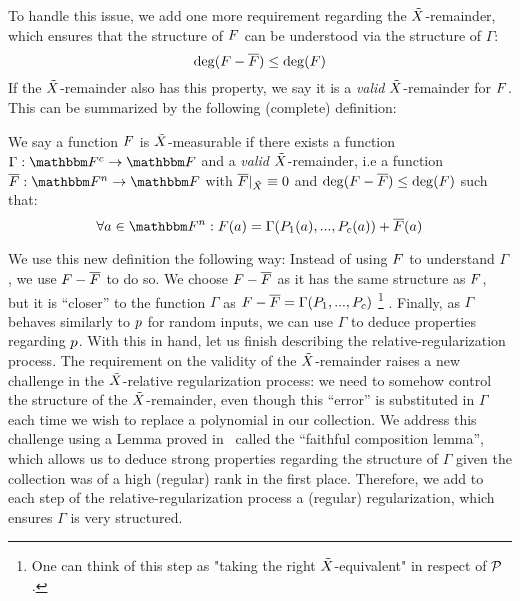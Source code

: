 To handle this issue, we add one more requirement regarding the ${\tilde{X}}$-remainder,
which ensures that the structure of $\genfunc$ can be understood via the structure of $\Gamma$:
\[
    \deg(\genfunc - \relativeremainder{\genfunc}) \leq \deg(\genfunc)
\]
If the ${\tilde{X}}$-remainder also has this property, we say it is a \emph{valid} ${\tilde{X}}$-remainder for $\genfunc$.
This can be summarized by the following (complete) definition:
\begin{definition}
    We say a function $\genfunc$ is ${\tilde{X}}$-measurable
    if there exists a function $\funcdef{\Gamma}{\basefield^c}{\basefield}$
    and a \emph{valid} ${\tilde{X}}$-remainder, i.e a function $\funcdef{\relativeremainder{\genfunc}}{\field}{\basefield}$
    with $\restrictfunc{\relativeremainder{\genfunc}}{\variety} \equiv 0$ and $\deg(\genfunc - \relativeremainder{\genfunc}) \leq \deg(\genfunc)$
    such that:
    \[
        \forall a \in \field: \genfunc(a) = \Gamma(\genpoly_1(a),...,\genpoly_c(a)) + \relativeremainder{\genfunc}(a)
    \]
\end{definition}
We use this new definition the following way:
Instead of using $\genfunc$ to understand $\Gamma$, we use $\genfunc - \relativeremainder{\genfunc}$ to do so.
We choose $\genfunc - \relativeremainder{\genfunc}$ as it has the same structure as $\genfunc$, but it is ``closer'' to the function $\Gamma$ as $\genfunc - \relativeremainder{\genfunc} = \Gamma(\genpoly_1,...,\genpoly_c)$
\footnote{One can think of this step as "taking the right ${\tilde{X}}$-equivalent" in respect of $\genpolyset$.}
.
Finally, as $\Gamma$ behaves similarly to $\onvarpoly$ for random inputs, we can use $\Gamma$ to deduce properties regarding $\onvarpoly$.
\newline
With this in hand, let us finish describing the relative-regularization process.
The requirement on the validity of the ${\tilde{X}}$-remainder raises a new challenge in the ${\tilde{X}}$-relative regularization process:
we need to somehow control the structure of the ${\tilde{X}}$-remainder, even though this ``error''
is substituted in $\Gamma$ each time we wish to replace a polynomial in our collection.
We address this challenge using a Lemma proved in~\cite{DBLP:journals/corr/0001L15} called the ``faithful composition lemma'',
which allows us to deduce strong properties regarding the structure of $\Gamma$ given the collection was of a high (regular) rank in the first place.
Therefore, we add to each step of the relative-regularization process a (regular) regularization, which ensures $\Gamma$ is very structured.
